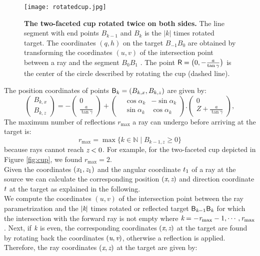 \begin{figure}[t]%
 \begin{center}
  \texttt{[image: rotatedcup.jpg]}
  \end{center}
 \caption{\textbf{The two-faceted cup rotated twice on both sides.} The line segment with end points $B_{k-1}$ and $B_{k}$ is the $|k|$ times rotated target. The coordinates $(q,h)$ on the target $B_{-1}B_{0}$ are obtained by transforming the coordinates $(u,v)$ of the intersection point between a ray and the segment $B_0B_1$ . The point $\textsf{R} = \big(0,-\frac{a}{\tan{\gamma}}\big)$ is the center of the circle described by rotating the cup (dashed line).}
  \label{fig:twofaced}
  \end{figure}
The position coordinates of points $\textsf{B}_k = (B_{k,x}, B_{k,z})$ are given by:
\begin{equation}
 \begin{pmatrix} B_{k,x}  \\  B_{k,z}\end{pmatrix}= -
  \begin{pmatrix} 0  \\  \frac{a}{\tan\gamma}\end{pmatrix}+
 \left(\begin{split}  & \cos\alpha_k  & -\sin\alpha_k \\  & \sin\alpha_k & \cos\alpha_k\end{split}\right).
 \begin{pmatrix}  0 \\  Z+\frac{a}{\tan\gamma}\end{pmatrix},
\end{equation}
The maximum number of reflections $r_{\textrm{max}}$ a ray can undergo before arriving at the target is:
\begin{equation}
r_{\textrm{max}}=\max\{k\in\mathbb{N} \;| \; B_{k-1,z}\geq 0\}
\end{equation}
because rays cannot reach $\textit{z}<0$.
For example, for the two-faceted cup depicted in Figure \ref{fig:cup}, we found $r_{\textrm{max}}=2$.\\ \indent 
Given the coordinates $(\textit{x}_1, \textit{z}_1)$ and the angular coordinate $t_1$ of a ray at the source we can calculate the corresponding position $(\textit{x}, \textit{z})$ and direction coordinate $t$ at the target as explained in the following. \\ \indent We compute the coordinates $(u,v)$ of the intersection point between the ray parametrization and the $|\textit{k}|$ times rotated or reflected target $\textsf{B}_{\textit{k}-1}\textsf{B}_{\textit{k}}$ for which the intersection with the forward ray is not empty where $\textit{k}=-\textit{r}_{\textrm{max}}-1, \cdots, \textit{r}_{\textrm{max}}$. Next, if $\textit{k}$ is even, the corresponding coordinates $(\textit{x},\textit{z})$ at the target are found by rotating back the coordinates $(\textit{u},\textit{v})$, otherwise a reflection is applied. Therefore, the ray coordinates $(\textit{x},\textit{z})$ at the target are given by:
